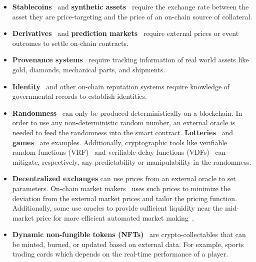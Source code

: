 \begin{itemize}

\item \textbf{Stablecoins}~\cite{clark2019sok,MSS20,PHP+19,gu2020empirical,MAKERDAOOracle} and \textbf{synthetic assets}~\cite{SCM21} require the exchange rate between the asset they are price-targeting and the price of an on-chain source of collateral. 
\item \textbf{Derivatives}~\cite{eskandari2017feasibility,biryukov2017findel,synthetix} and \textbf{prediction markets}~\cite{clark2014decentralizing,peterson2015augur} require external prices or event outcomes to settle on-chain contracts.
\item \textbf{Provenance systems}~\cite{RKYCC19,tian2016agri} require tracking information of real world assets like gold, diamonds, mechanical parts, and shipments.
\item \textbf{Identity}~\cite{KL17,maram2021candid} and other on-chain reputation systems require knowledge of governmental records to establish identities.
\item \textbf{Randomness}~\cite{chainlinkvrf} can only be produced deterministically on a blockchain. In order to use any non-deterministic random number, an external oracle is needed to feed the randomness into the smart contract. \textbf{Lotteries}~\cite{pooltogether} and \textbf{games}~\cite{etheroll} are examples. Additionally, cryptographic tools like verifiable random functions (VRF)~\cite{micali1999verifiable,goldbe-vrf-01} and verifiable delay functions (VDFs)~\cite{bunz2017proofs,crypto-2018-28858} can mitigate, respectively, any predictability or manipulability in the randomness.
\item \textbf{Decentralized exchanges} can use prices from an external oracle to set parameters. On-chain market makers~\cite{hertzog2017bancor} uses such prices to minimize the deviation from the external market prices and tailor the pricing function. Additionally, some use oracles to provide sufficient liquidity near the mid-market price for more efficient automated market making~\cite{dodopmm,cofixwhitepaper,cofixblog}.
\item \textbf{Dynamic non-fungible tokens (NFTs)}~\cite{chainlinknft} are crypto-collectables that can be minted, burned, or updated based on external data. For example, sports trading cards which depends on the real-time performance of a player.
\end{itemize}




